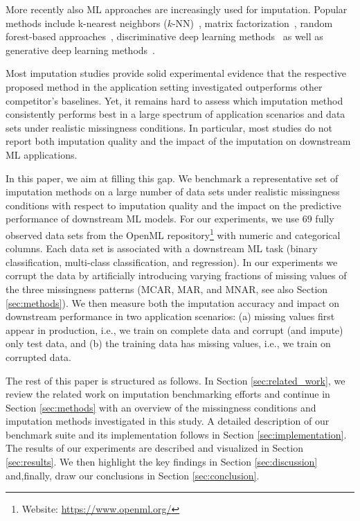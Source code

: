 More recently also ML approaches are increasingly used for imputation. Popular methods include k-nearest neighbors ($k$-NN)~\citep{Batista2003}, matrix factorization~\citep{Troyanskaya2001,Koren2009,Mazumder2010}, random forest-based approaches~\citep{Stekhoven2012}, discriminative deep learning methods~\citep{Biessmann2018a} as well as generative deep learning methods~\citep{HIVAE,GAIN}.

Most imputation studies provide solid experimental evidence that the respective proposed method in the application setting investigated outperforms other competitor's baselines. Yet, it remains hard to assess which imputation method consistently performs best in a large spectrum of application scenarios and data sets under realistic missingness conditions. In particular, most studies do not report both imputation quality and the impact of the imputation on downstream ML applications.

In this paper, we aim at filling this gap. We benchmark a representative set of imputation methods on a large number of data sets under realistic missingness conditions with respect to imputation quality and the impact on the predictive performance of downstream ML models. For our experiments, we use $69$ fully observed data sets from the OpenML repository\footnote{Website: \url{https://www.openml.org/}} \citep{OpenML2013} with numeric and categorical columns. Each data set is associated with a downstream ML task (binary classification, multi-class classification, and regression). In our experiments we corrupt the data by artificially introducing varying fractions of missing values of the three missingness patterns (MCAR, MAR, and MNAR, see also Section \ref{sec:methods}). We then measure both the imputation accuracy and impact on downstream performance in two application scenarios: (a) missing values first appear in production, i.e., we train on complete data and corrupt (and impute) only test data, and (b) the training data has missing values, i.e., we train on corrupted data.

The rest of this paper is structured as follows. In Section \ref{sec:related_work}, we review the related work on imputation benchmarking efforts and continue in Section \ref{sec:methods} with an overview of the missingness conditions and imputation methods investigated in this study. A detailed description of our benchmark suite and its implementation follows in Section \ref{sec:implementation}. The results of our experiments are described and visualized in Section \ref{sec:results}. We then highlight the key findings in Section \ref{sec:discussion} and,finally, draw our conclusions in Section \ref{sec:conclusion}.
